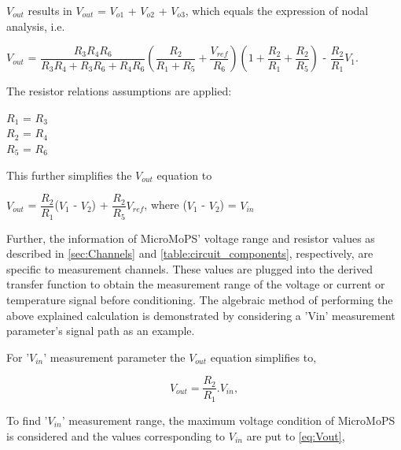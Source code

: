 \begin{flushleft}
\hspace{-9mm}
$V_{out}$ results in $V_{out}$ = $V_{o1}$ + $V_{o2}$ + $V_{o3}$, which equals the expression of nodal analysis, i.e.

\hspace{-9mm}
$V_{out}$ = $\dfrac{R_3R_4R_6}{R_3R_4 + R_3R_6 + R_4R_6}$$\left(\dfrac{R_2}{R_1 + R_5} + \dfrac{V_{ref}}{R_6}\right)$$\left(1 + \dfrac{R_2}{R_1} + \dfrac{R_2}{R_5}\right)$ - $\dfrac{R_2}{R_1}V_1$.

\hspace{-9mm}
The resistor relations assumptions are applied:


\hspace{-9mm}
${R_1}$ = ${R_3}$\\
\hspace{-9mm}
${R_2}$ = ${R_4}$\\
\hspace{-9mm}
${R_5}$ = ${R_6}$

\hspace{-9mm}
This further simplifies the $V_{out}$ equation to

\hspace{-9mm}
$V_{out}$ = $\dfrac{R_2}{R_1}$($V_{1}$ - $V_{2}$) + $\dfrac{R_2}{R_5}$$V_{ref}$, \hspace{9mm} where ($V_{1}$ - $V_{2}$) = $V_{in}$ 
\end{flushleft}

\hspace{-10mm}Further, the information of MicroMoPS' voltage range and resistor values as described in \cref{sec:Channels} and \cref{table:circuit_components}, respectively, are specific to measurement channels. These values are plugged into the derived transfer function to 
obtain the measurement range of the voltage or current or temperature signal before 
conditioning. The algebraic method of performing the above explained calculation is 
demonstrated by considering a '\acrshort{Vin}' measurement parameter's signal path as an example.	

\hspace{-10mm}
For '$V_{in}$' measurement parameter the $V_{out}$ equation simplifies to,

\begin{equation}
V_{out} = \dfrac{R_2}{R_1}.V_{in}, 
\label{eq:Vout}
\end{equation}

\hspace{-10mm}
To find '$V_{in}$' measurement range, the maximum voltage condition of MicroMoPS is considered and the values corresponding to $V_{in}$ are put to \cref{eq:Vout},

